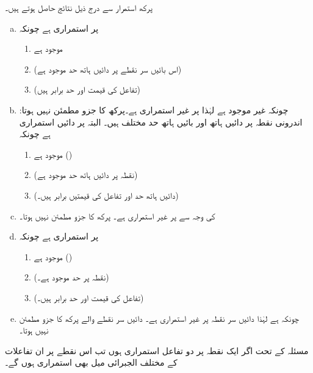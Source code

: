 پرکھ استمرار سے درج ذیل نتائج حاصل ہوتے ہیں۔
\begin{enumerate}[a.]
\item
{} پر  استمراری ہے چونکہ
\begin{enumerate}[1.]
\item
{} موجود ہے 
\item
{} 
\quad\quad
(اس بائیں سر نقطے پر دائیں ہاتھ حد موجود ہے)
\item
{}
\quad\quad
(تفاعل کی قیمت اور حد برابر ہیں)
\end{enumerate}

\item
چونکہ  غیر موجود ہے لہٰذا  پر  غیر استمراری ہے۔پرکھ کا جزو  مطمئن نہیں ہوتا: اندرونی نقطہ  پر دائیں ہاتھ اور بائیں ہاتھ حد مختلف ہیں۔ البتہ  پر  دائیں استمراری ہے چونکہ
\begin{enumerate}[1.]
\item
{} موجود ہے ()
\item
{} (نقطہ  پر دائیں ہاتھ حد موجود ہے)
\item
{} (دائیں ہاتھ حد اور تفاعل کی قیمتیں برابر ہیں۔) 
\end{enumerate}
\item
{} کی  وجہ سے  پر  غیر استمراری ہے۔ پرکھ کا جزو  مطمئن نہیں ہوتا۔
\item
{} پر  استمراری ہے چونکہ
\begin{enumerate}[1.]
\item
{} موجود ہے ()
\item
{} (نقطہ  پر حد موجود ہے۔)
\item
{} (تفاعل کی قیمت اور حد برابر ہیں۔)
\end{enumerate}
\item
چونکہ  ہے لہٰذا دائیں سر نقطہ  پر  غیر استمراری ہے۔ دائیں سر نقطے والے پرکھ کا جزو  مطمئن نہیں ہوتا۔  

\end{enumerate}


مسئلہ  کے تحت اگر ایک نقطہ پر دو تفاعل استمراری ہوں تب اس نقطے پر ان تفاعلات   کے  مختلف الجبرائی میل بھی استمراری ہوں گے۔

